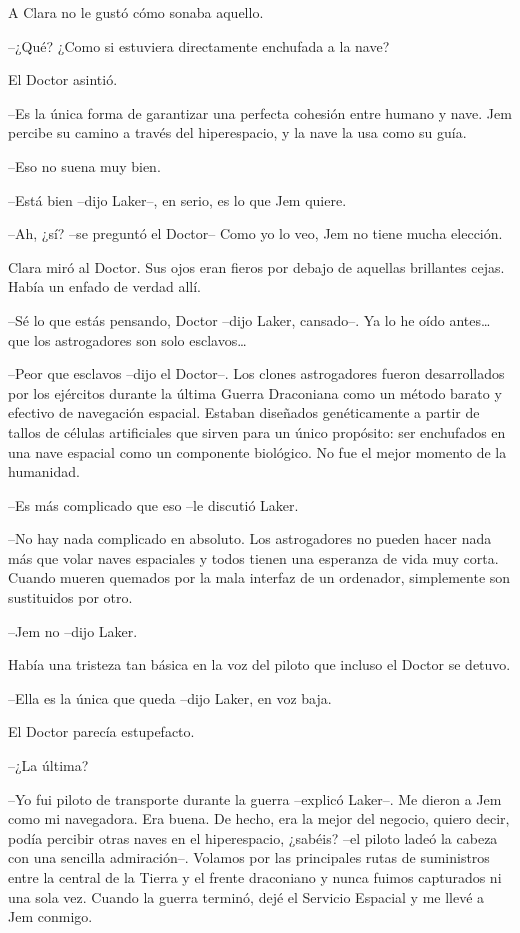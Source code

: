 {A Clara no le gustó cómo sonaba aquello.}

{--¿Qué? ¿Como si estuviera directamente enchufada a la nave?}

{El Doctor asintió.}

{--Es la única forma de garantizar una perfecta cohesión entre humano y
 nave. Jem percibe su camino a través del hiperespacio, y la nave la usa
como su guía.}

{--Eso no suena muy bien.}

{--Está bien --dijo Laker--, en serio, es lo que Jem quiere.}

{--Ah, ¿sí? --se preguntó el Doctor-- Como yo lo veo, Jem no tiene mucha
elección.}

{Clara miró al Doctor. Sus ojos eran fieros por debajo de aquellas
brillantes cejas. Había un enfado de verdad allí.}

{--Sé lo que estás pensando, Doctor --dijo Laker, cansado--. Ya lo he
 oído antes\ldots{} que los astrogadores son solo esclavos\ldots{}}

{--Peor que esclavos --dijo el Doctor--. Los clones astrogadores fueron
 desarrollados por los ejércitos durante la última Guerra Draconiana como
 un método barato y efectivo de navegación espacial. Estaban diseñados
 genéticamente a partir de tallos de células artificiales que sirven para
 un único propósito: ser enchufados en una nave espacial como un
componente biológico. No fue el mejor momento de la humanidad.}

{--Es más complicado que eso --le discutió Laker.}

{--No hay nada complicado en absoluto. Los astrogadores no pueden hacer
 nada más que volar naves espaciales y todos tienen una esperanza de vida
 muy corta. Cuando mueren quemados por la mala interfaz de un ordenador,
simplemente son sustituidos por otro.}

{--Jem no --dijo Laker.}

{Había una tristeza tan básica en la voz del piloto que incluso el Doctor
se detuvo.}

{--Ella es la única que queda --dijo Laker, en voz baja.}

{El Doctor parecía estupefacto.}

{--¿La última?}

{--Yo fui piloto de transporte durante la guerra --explicó Laker--. Me
 dieron a Jem como mi navegadora. Era buena. De hecho, era la mejor del
 negocio, quiero decir, podía percibir otras naves en el hiperespacio,
 ¿sabéis? --el piloto ladeó la cabeza con una sencilla admiración--.
 Volamos por las principales rutas de suministros entre la central de la
 Tierra y el frente draconiano y nunca fuimos capturados ni una sola vez.
 Cuando la guerra terminó, dejé el Servicio Espacial y me llevé a Jem
conmigo.}


